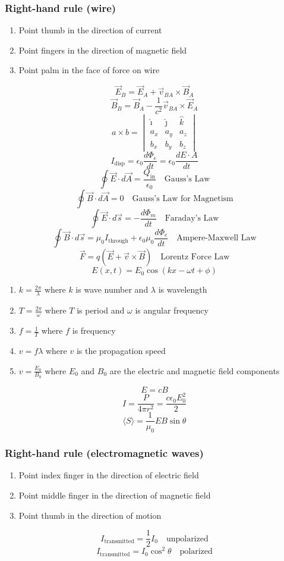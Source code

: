 \documentclass[8pt,twocolumn]{extarticle}
\begin{document}
\subsubsection*{Right-hand rule (wire)}
\begin{enumerate}
    \item Point thumb in the direction of current
    \item Point fingers in the direction of magnetic field
    \item Point palm in the face of force on wire
\end{enumerate}
\[\vec{E}_B = \vec{E}_A + \vec{v}_{BA}\times \vec{B}_A\]
\[\vec{B}_B = \vec{B}_A - \frac{1}{c^2}\vec{v}_{BA}\times \vec{E}_A\]
\[a\times b = \begin{vmatrix}
    \hat{\imath} & \hat{\jmath} & \hat{k} \\
    a_x & a_y & a_z \\
    b_x & b_y & b_z
\end{vmatrix}\]
\[I_\text{disp}=\epsilon_0\frac{d\Phi_e}{dt}=\epsilon_0 \frac{dE\cdot A}{dt}\]
\[\oint\vec{E}\cdot d\vec{A}=\frac{Q_\text{in}}{\epsilon_0}\quad\text{Gauss's Law}\]
\[\oint\vec{B}\cdot d\vec{A}=0\quad\text{Gauss's Law for Magnetism}\]
\[\oint\vec{E}\cdot d\vec{s} = -\frac{d\Phi_m}{dt}\quad\text{Faraday's Law}\]
\[\oint\vec{B}\cdot d\vec{s} = \mu_0 I_\text{through} + \epsilon_0 \mu_0 \frac{d\Phi_e}{dt}\quad\text{Ampere-Maxwell Law}\]
\[\vec{F}=q(\vec{E} + \vec{v} \times \vec{B})\quad\text{Lorentz Force Law}\]
\[E(x, t) = E_0 \cos\left(kx - \omega t + \phi\right)\]
\begin{enumerate}
    \item $k=\frac{2\pi}{\lambda}$ where $k$ is wave number and $\lambda$ is wavelength
    \item $T=\frac{2\pi}{\omega}$ where $T$ is period and $\omega$ is angular frequency
    \item $f=\frac{1}{T}$ where $f$ is frequency
    \item $v=f\lambda$ where $v$ is the propagation speed
    \item $v=\frac{E_0}{B_0}$ where $E_0$ and $B_0$ are the electric and magnetic field components
\end{enumerate}
\[E=cB\]
\[I=\frac{P}{4\pi r^2}=\frac{c\epsilon_0 E_0^2}{2}\]
\[\langle S \rangle = \frac{1}{\mu_0}EB\sin\theta\]
\subsubsection*{Right-hand rule (electromagnetic waves)}
\begin{enumerate}
    \item Point index finger in the direction of electric field
    \item Point middle finger in the direction of magnetic field
    \item Point thumb in the direction of motion
\end{enumerate}
\[I_\text{transmitted}=\frac{1}{2} I_0\quad\text{unpolarized}\]
\[I_\text{transmitted}=I_0\cos^2\theta\quad\text{polarized}\]
\end{document}
